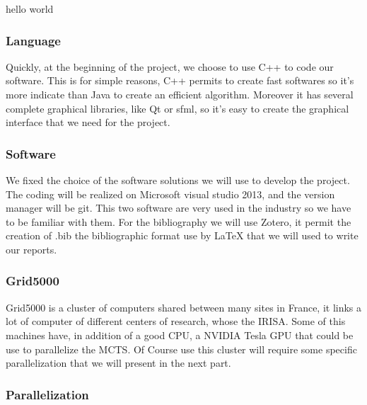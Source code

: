 hello world \\

\subsubsection{Language}
	Quickly, at the beginning of the project, we choose to use C++ to code our software. This is for simple reasons, C++ permits to create fast softwares so it's more indicate than Java to create an efficient algorithm.  Moreover it has several complete graphical libraries, like Qt or sfml, so it's easy to create the graphical interface that we need for the project.

\subsubsection{Software}
	We fixed the choice of the software solutions we will use to develop the project. The coding  will be realized on Microsoft visual studio 2013, and the version manager will be git. This two software are very used in the industry so we have to be familiar with them.
For the bibliography we will use Zotero, it permit the creation of .bib the bibliographic format use by LaTeX that we will used to write our reports.

\subsubsection{Grid5000}
	Grid5000 is a cluster of computers shared between many sites in France, it links a lot of computer of different centers of research, whose the IRISA. Some of this machines have, in addition of a good CPU, a NVIDIA Tesla GPU that could be use to parallelize the MCTS. Of Course use this cluster will require some specific parallelization that we will present in the next part.

\subsubsection{Parallelization}

